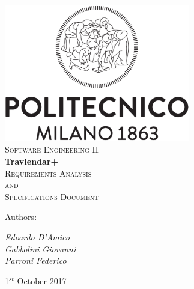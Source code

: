 \documentclass [11pt,a4paper,oneside,openany]{book} %
\begin{document}

\begin{titlepage}

 \begin{center} 
     \includegraphics[height=6cm]{logo.eps}\\
     \vspace{4em}
     {\Large \textsc{Software Engineering II}}\\
     \vspace{6em}
     {\LARGE \textbf{Travlendar+}}\\
     \vspace{3em}
     {\Large \textsc{Requirements Analysis}}\\
     \vspace{1em}
     {\Large \textsc{and}}\\
     \vspace{1em}
     {\Large \textsc{Specifications Document}}\\
 \end{center}
 
    \vskip 2cm
 
 	Authors:
 	\vspace{0.5em}
 	\begin{center}
      {\Large \textit{Edoardo D'Amico}}\\
      {\Large \textit{Gabbolini Giovanni}}\\
      {\Large \textit{Parroni Federico}}\\
    \end{center}

\vskip 2.0cm
\begin{center}
{\normalsize 1$^{st}$ October 2017}
\end{center}

\end{titlepage}

\newpage
\end{document}
